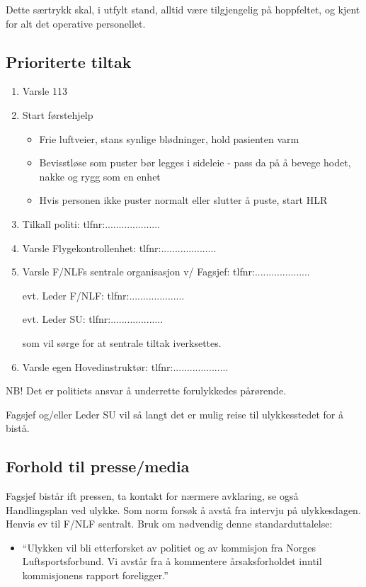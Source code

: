 Dette særtrykk skal, i utfylt stand, alltid være tilgjengelig på hoppfeltet, og kjent for alt det operative personellet.

\subsection{Prioriterte tiltak}
\begin{enumerate}
	\item Varsle 113
	\item Start førstehjelp
	\begin{itemize}
		\item Frie luftveier, stans synlige blødninger, hold pasienten varm
		\item Bevisstløse som puster bør legges i sideleie - pass da på å bevege hodet, nakke og rygg som en enhet
		\item Hvis personen ikke puster normalt eller slutter å puste, start HLR
	\end{itemize}
	\item Tilkall politi: tlfnr:....................
	\item Varsle Flygekontrollenhet: tlfnr:....................
	\item Varsle F/NLFs sentrale organisasjon v/ Fagsjef: tlfnr:....................

	evt. Leder F/NLF: tlfnr:....................

	evt. Leder SU: tlfnr:...................

	som vil sørge for at sentrale tiltak iverksettes.
	\item Varsle egen Hovedinstruktør: tlfnr:....................
\end{enumerate}

NB! Det er politiets ansvar å underrette forulykkedes pårørende.

Fagsjef og/eller Leder SU vil så langt det er mulig reise til ulykkesstedet for å bistå.

\subsection{Forhold til presse/media}
Fagsjef bistår ift pressen, ta kontakt for nærmere avklaring, se også Handlingsplan ved ulykke. Som norm forsøk å avstå fra intervju på ulykkesdagen. Henvis ev til F/NLF sentralt. Bruk om nødvendig denne standarduttalelse:
\begin{itemize}
	\item ``Ulykken vil bli etterforsket av politiet og av kommisjon fra Norges Luftsportsforbund. Vi avstår fra å kommentere årsaksforholdet inntil kommisjonens rapport foreligger.''
\end{itemize}

